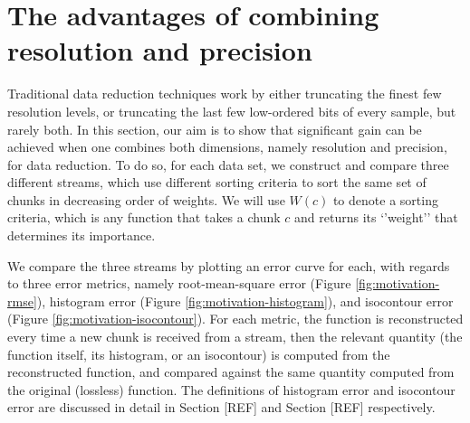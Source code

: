 \section{The advantages of combining resolution and precision}
\label{sec:motivation}

Traditional data reduction techniques work by either truncating the finest few resolution levels, or
truncating the last few low-ordered bits of every sample, but rarely both. In this section, our aim
is to show that significant gain can be achieved when one combines both dimensions, namely
resolution and precision, for data reduction. To do so, for each data set, we construct and compare
three different streams, which use different sorting criteria to sort the same set of chunks in
decreasing order of weights. We will use $W(c)$ to denote a sorting criteria, which is any function
that takes a chunk $c$ and returns its `'weight'' that determines its importance.

We compare the three streams by plotting an error curve for each, with regards to three error
metrics, namely root-mean-square error (Figure \ref{fig:motivation-rmse}), histogram error (Figure
\ref{fig:motivation-histogram}), and isocontour error (Figure \ref{fig:motivation-isocontour}). For
each metric, the function is reconstructed every time a new chunk is received from a stream, then
the relevant quantity (the function itself, its histogram, or an isocontour) is computed from the
reconstructed function, and compared against the same quantity computed from the original (lossless)
function. The definitions of histogram error and isocontour error are discussed in detail in Section
[REF] and Section [REF] respectively.

